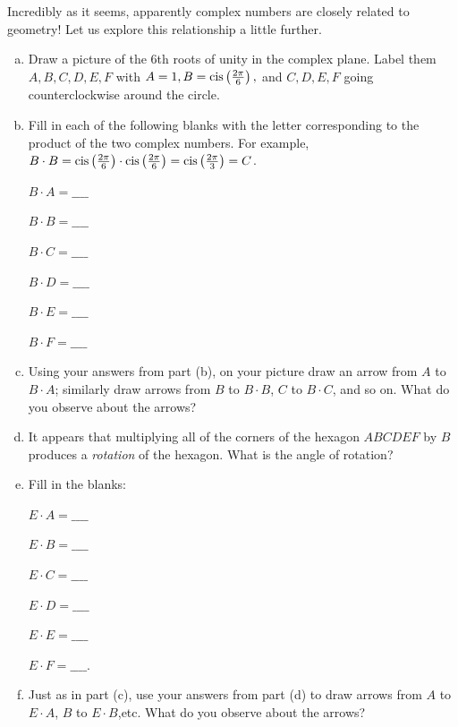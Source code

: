 {Incredibly as it seems, apparently complex numbers are closely related to geometry! Let us explore this relationship a little further.

\begin{exercise}\label{exercise:complex:hexagon_rotate}
\begin{enumerate}[(a)]
\item
Draw a picture of the  6th roots of unity in the complex plane. Label them $A,B,C,D,E,F$ with $A=1, B= \operatorname{cis}\left(\frac{2\pi}{6}\right),$ and $C,D,E,F$ going counterclockwise around the circle.
\item
Fill in each of the following blanks with the letter corresponding to the product of the two complex numbers. For example,  $B \cdot B = \operatorname{cis}\left(\frac{2\pi}{6}\right) \cdot \operatorname{cis}\left(\frac{2\pi}{6}\right) = \operatorname{cis}\left(\frac{2\pi}{3}\right) = C$.
\begin{multicols}{3}
$B \cdot A = \_\_\_\_$

$B \cdot B = \_\_\_\_$ 

$B \cdot C = \_\_\_\_$

$B \cdot D = \_\_\_\_$

$B \cdot E = \_\_\_\_$ 

$B \cdot F = \_\_\_\_$
\end{multicols}

\item
Using your answers from part (b), on your picture draw an arrow from $A$ to $B \cdot A$; similarly draw arrows from $B$ to $B \cdot B$, $C$ to $B \cdot C$, and so on. What do you observe about the arrows?
\item
It appears that multiplying all of the corners of the hexagon $ABCDEF$ by $B$ produces a \emph{rotation} of the hexagon. What is the angle of rotation?
\item
Fill in the blanks:
\begin{multicols}{3}
$E \cdot A = \_\_\_\_$

 $E \cdot B = \_\_\_\_$

 $E \cdot C = \_\_\_\_$

$E \cdot D = \_\_\_\_$


$E \cdot E = \_\_\_\_$

 $E \cdot F = \_\_\_\_$.

\end{multicols}

\item Just as in part (c), use your answers from part (d) to draw arrows from $A$ to $E \cdot A$, $B$ to $E \cdot B$,etc. What do you observe about the arrows? 


\end{enumerate}
\end{exercise}}
